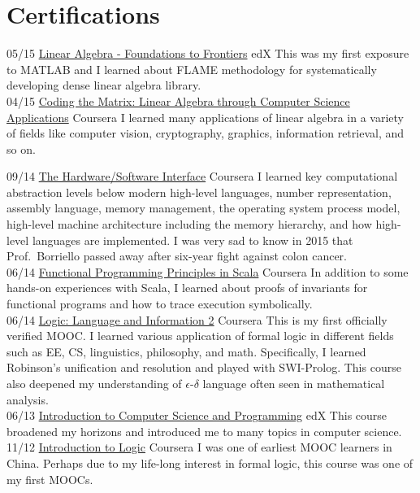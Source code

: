 \documentclass[a4paper]{friggeri-cv}
\begin{document}
\section{Certifications}
\begin{entrylist}
  \entry
  {05/15}
  {\href{https://s3.amazonaws.com/verify.edx.org/downloads/5eb2696ec8874930bb0fda0b8b6756b6/Certificate.pdf}{Linear Algebra - Foundations to Frontiers}}
  {edX}
  {This was my first exposure to MATLAB and I learned about FLAME methodology for systematically developing dense linear algebra library.\\}
  \entry
  {04/15}
  {\href{https://s3.amazonaws.com/accredible_user_certificate/certificates/144339/original/Coursera_matrix_2015.pdf}{Coding the Matrix: Linear Algebra through Computer Science Applications}}
  {Coursera}
  {I learned many applications of linear algebra in a variety of fields like computer vision, cryptography, graphics, information retrieval, and so on.}
\end{entrylist}
\begin{entrylist}
  \entry
  {09/14}
  {\href{https://s3.amazonaws.com/accredible_user_certificate/certificates/53611/original/Coursera_hwswinterface_2014.pdf}{The Hardware/Software Interface}}
  {Coursera}
  {I learned key computational abstraction levels below modern high-level languages, number representation, assembly language, memory management, the operating system process model, high-level machine architecture including the memory hierarchy, and how high-level languages are implemented.  I was very sad to know in 2015 that Prof.\ Borriello passed away after six-year fight against colon cancer.\\}
  \entry
  {06/14}
  {\href{https://www.coursera.org/account/accomplishments/records/jeAXpfyLDdj7TBYK}{Functional Programming Principles in Scala}}
  {Coursera}
  {In addition to some hands-on experiences with Scala, I learned about proofs of invariants for functional programs and how to trace execution symbolically.\\}
  \entry
  {06/14}
  {\href{https://www.coursera.org/account/accomplishments/records/AqU3pfW4qRTd8FzE}{Logic: Language and Information 2}}
  {Coursera}
  {This is my first officially verified MOOC\@.  I learned various application of formal logic in different fields such as EE, CS, linguistics, philosophy, and math.  Specifically, I learned Robinson's unification and resolution and played with SWI-Prolog.  This course also deepened my understanding of \(\epsilon\textit{-}\delta\) language often seen in mathematical analysis.\\}
  \entry
  {06/13}
  {\href{https://s3.amazonaws.com/verify.edx.org/downloads/eedec1d10b884139876bee106313142c/Certificate.pdf}{Introduction to Computer Science and Programming}}
  {edX}
  {This course broadened my horizons and introduced me to many topics in computer science.\\}
  \entry
  {11/12}
  {\href{https://s3.amazonaws.com/accredible_user_certificate/certificates/48300/original/IntroLogic.pdf}{Introduction to Logic}}
  {Coursera}
  {I was one of earliest MOOC learners in China.  Perhaps due to my life-long interest in formal logic, this course was one of my first MOOCs.}
\end{entrylist}
\end{document}
